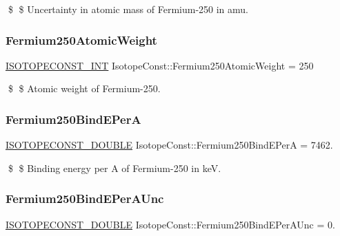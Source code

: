 \$ \$ Uncertainty in atomic mass of Fermium-\/250 in amu. \mbox{\label{group___isotope_const-_fermium-_fm250_gae5e051f0e9c306f930ebf1d766311e16}} 
\subsubsection{\texorpdfstring{Fermium250\+Atomic\+Weight}{Fermium250AtomicWeight}}
{\footnotesize\ttfamily \mbox{\hyperlink{group___isotope_const-_macros_ga5f18360b3e99483a35c32d789e62621c}{I\+S\+O\+T\+O\+P\+E\+C\+O\+N\+S\+T\+\_\+\+I\+NT}} Isotope\+Const\+::\+Fermium250\+Atomic\+Weight = 250}

\$ \$ Atomic weight of Fermium-\/250. \mbox{\label{group___isotope_const-_fermium-_fm250_gadcb698054fe019456e95eb895534da15}} 
\subsubsection{\texorpdfstring{Fermium250\+Bind\+E\+PerA}{Fermium250BindEPerA}}
{\footnotesize\ttfamily \mbox{\hyperlink{group___isotope_const-_macros_ga8f45a7272ce02c0b4c65c44636ed719a}{I\+S\+O\+T\+O\+P\+E\+C\+O\+N\+S\+T\+\_\+\+D\+O\+U\+B\+LE}} Isotope\+Const\+::\+Fermium250\+Bind\+E\+PerA = 7462.}

\$ \$ Binding energy per A of Fermium-\/250 in keV. \mbox{\label{group___isotope_const-_fermium-_fm250_ga1e8ac7dbb63daf09e9b677602e1bec8c}} 
\subsubsection{\texorpdfstring{Fermium250\+Bind\+E\+Per\+A\+Unc}{Fermium250BindEPerAUnc}}
{\footnotesize\ttfamily \mbox{\hyperlink{group___isotope_const-_macros_ga8f45a7272ce02c0b4c65c44636ed719a}{I\+S\+O\+T\+O\+P\+E\+C\+O\+N\+S\+T\+\_\+\+D\+O\+U\+B\+LE}} Isotope\+Const\+::\+Fermium250\+Bind\+E\+Per\+A\+Unc = 0.}

